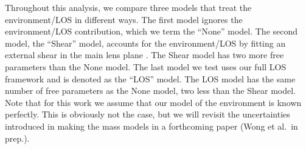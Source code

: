 Throughout this analysis, we compare three models that treat the environment/LOS in different ways. The first model ignores the environment/LOS contribution, which we term the ``None'' model. The second model, the ``Shear'' model, accounts for the environment/LOS by fitting an external shear in the main lens plane \citep[e.g.,][]{Suyu13}. The Shear model has two more free parameters than the None model. The last model we test uses our full LOS framework and is denoted as the ``LOS'' model. The LOS model has the same number of free parameters as the None model, two less than the Shear model. Note that for this work we assume that our model of the environment is known perfectly. This is obviously not the case, but we will revisit the uncertainties introduced in making the mass models in a forthcoming paper (Wong et al.~in prep.).
  